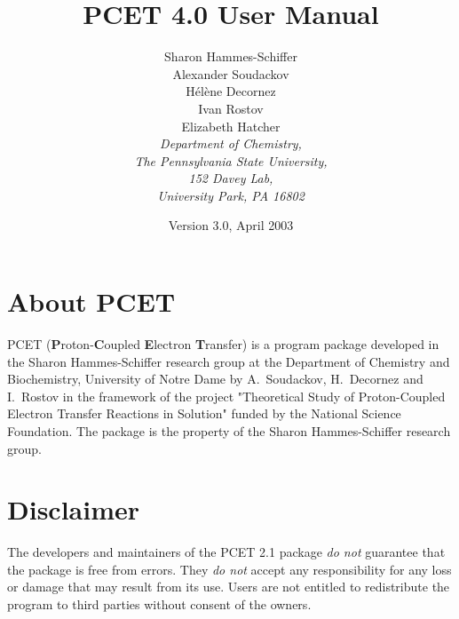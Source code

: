 \documentclass[oneside,11pt,openany]{book}
\begin{document}
%
\title{PCET 4.0 User Manual}
%
\author{Sharon Hammes-Schiffer\\
Alexander Soudackov\\
H\'el\`ene Decornez\\
Ivan Rostov\\
Elizabeth Hatcher\\
%
\it{\small Department of Chemistry,}\\
\it{\small The Pennsylvania State University,}\\
\it{\small 152 Davey Lab,}\\
\it{\small University Park, PA 16802}}
%
\date{Version 3.0, April 2003}

\maketitle
\frontmatter
\chapter*{About PCET}
PCET ({\bf P}roton-{\bf C}oupled {\bf E}lectron {\bf T}ransfer)
is a program package developed in the Sharon Hammes-Schiffer
research group at the Department of Chemistry and Biochemistry,
University of Notre Dame by A.~Soudackov, H.~Decornez and I.~Rostov in
the framework of the project "Theoretical Study of Proton-Coupled
Electron Transfer Reactions in Solution" funded by the National Science
Foundation. The package is the property of the Sharon Hammes-Schiffer
research group.

\chapter*{Disclaimer}
The developers and maintainers of the PCET 2.1 package {\em do not}
guarantee that the package is free from errors. They {\em do not}
accept any responsibility for any loss or damage that may result
from its use. Users are not entitled to redistribute the program
to third parties without consent of the owners.

\tableofcontents

\mainmatter

\end{document}
